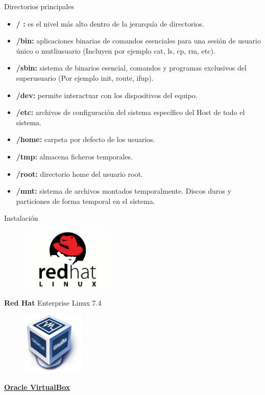 \documentclass{beamer}
\begin{document}
\begin{frame}{Directorios principales}
\begin{itemize}
\item \textbf{/ :} es el nivel más alto dentro de la jerarquía de directorios.
\item \textbf{/bin:} aplicaciones binarias de comandos esenciales para una sesión de usuario único o mutliusuario (Incluyen por ejemplo cat, ls, cp, rm, etc).
\item \textbf{/sbin: }sistema de binarios esencial, comandos y programas exclusivos del superusuario (Por ejemplo init, route, ifup).
\item \textbf{/dev:} permite interactuar con los dispositivos del equipo.
\item \textbf{/etc:} archivos de configuración del sistema específico del Host de todo el sistema.
\item \textbf{/home:} carpeta por defecto de los usuarios.
\item \textbf{/tmp:} almacena ficheros temporales.
\item \textbf{/root:} directorio home del usuario root.
\item \textbf{/mnt:} sistema de archivos montados temporalmente. Discos duros y particiones de forma temporal en el sistema.
\end{itemize}
\end{frame}
\begin{frame}{Instalación}
\begin{multicols}{2}
\centering
\begin{figure}
	\includegraphics[height=3cm]{img/rhel.png}
\end{figure}
\textbf{Red Hat} Enterprise Linux 7.4
\begin{figure}
	\includegraphics[height=3cm]{img/Virtualbox.png}
\end{figure}
\textbf{ \href{https://download.virtualbox.org/virtualbox/6.0.4/VirtualBox-6.0.4-128413-Win.exe}{Oracle VirtualBox}}

\end{multicols}

\end{frame}
\end{document}
